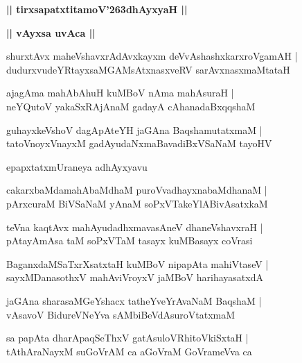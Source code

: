 \documentclass[twoside,12pt,openright]{book}
\def\S{\char'263}
\newcounter{shloka}[chapter]
\def\uvaca#1{\centerline{{\large\textbf{#1}}}}
\begin{document}
\begin{center}
{\LARGE\bfseries || tirxsapatxtitamoV\S dhAyxyaH || }
\end{center}

\uvaca{|| vAyxsa uvAca ||}

\begin{shloka}%
shurxtAvx maheVshavxrAdAvxkayxm deVvAshashxkarxroVgamAH |\\
dudurxvudeYRtayxsaMGAMsAtxnasxveRV sarAvxnasxmaMtataH 
\end{shloka}

\begin{shloka}%
ajagAma mahAbAhuH kuMBoV nAma mahAsuraH |\\
neYQutoV yakaSxRAjAnaM gadayA cAhanadaBxqqshaM 
\end{shloka}

\begin{shloka}%
guhayxkeVshoV dagApAteYH jaGAna BaqshamutatxmaM |\\
tatoVnoyxVnayxM gadAyudaNxmaBavadiBxVSaNaM tayoHV 
\end{shloka}

\begin{center}
epapxtatxmUraneya adhAyxyavu
\end{center}

\begin{shloka}%
cakarxbaMdamahAbaMdhaM puroVvadhayxnabaMdhanaM |\\
pArxcuraM BiVSaNaM yAnaM soPxVTakeYlABivAsatxkaM 
\end{shloka}

\begin{shloka}%
teVna kaqtAvx mahAyudadhxmavasAneV dhaneVshavxraH |\\
pAtayAmAsa taM soPxVTaM tasayx kuMBasayx coVrasi 
\end{shloka}

\begin{shloka}%
BaganxdaMSaTxrXsatxtaH kuMBoV nipapAta mahiVtaseV |\\
sayxMDanasothxV mahAviVroyxV jaMBoV harihayasatxdA 
\end{shloka}

\begin{shloka}%
jaGAna sharasaMGeYshacx tatheYveYrAvaNaM BaqshaM |\\
vAsavoV BidureVNeYva sAMbiBeVdAsuroVtatxmaM 
\end{shloka}

\begin{shloka}%
sa papAta dharApaqSeThxV gatAsuloVRhitoVkiSxtaH |\\
tAthAraNayxM suGoVrAM ca aGoVraM GoVrameVva ca 
\end{shloka}
\end{document}
